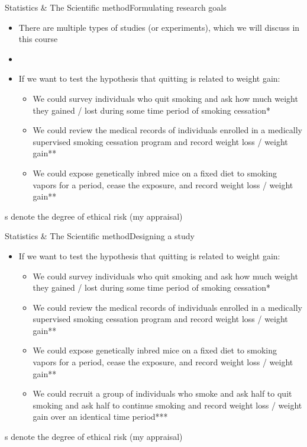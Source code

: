 \documentclass[xcolor=dvipsnames]{beamer}
\begin{document}
\begin{frame}{Statistics \& The Scientific method}{Formulating research goals}
	\begin{itemize}
		\item There are multiple types of studies (or experiments), which we will discuss in this course \pause
		\item[]
		\item If we want to test the hypothesis that quitting is related to weight gain: \pause
		\begin{itemize}
			\item We could survey individuals who quit smoking and ask how much weight they gained / lost during some time period of smoking cessation* \pause
			\item We could review the medical records of individuals enrolled in a medically supervised smoking cessation program and record weight loss / weight gain** \pause
			\item We could expose genetically inbred mice on a fixed diet to smoking vapors for a period, cease the exposure, and record weight loss / weight gain** \pause
		\end{itemize}
	\end{itemize}
{\tiny *s denote the degree of ethical risk (my appraisal)}
\end{frame}

\begin{frame}{Statistics \& The Scientific method}{Designing a study}
	\begin{itemize}
		\item If we want to test the hypothesis that quitting is related to weight gain:
		\begin{itemize}
			\item We could survey individuals who quit smoking and ask how much weight they gained / lost during some time period of smoking cessation*
			\item We could review the medical records of individuals enrolled in a medically supervised smoking cessation program and record weight loss / weight gain**
			\item We could expose genetically inbred mice on a fixed diet to smoking vapors for a period, cease the exposure, and record weight loss / weight gain**
			\item We could recruit a group of individuals who smoke and ask half to quit smoking and ask half to continue smoking and record weight loss / weight gain over an identical time period***
		\end{itemize}
	\end{itemize}
{\tiny *s denote the degree of ethical risk (my appraisal)}
\end{frame}
\end{document}
